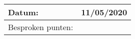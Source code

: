 \begin{tabularx}{\textwidth}{| l | X |}
  \hline
  Datum: & 11/05/2020\\
  \hline
  Besproken punten: &
  \begin{compactitem}
    \item \hl{}
    \item \hl{}
    \item \hl{}
  \end{compactitem}\\
  \hline
\end{tabularx}